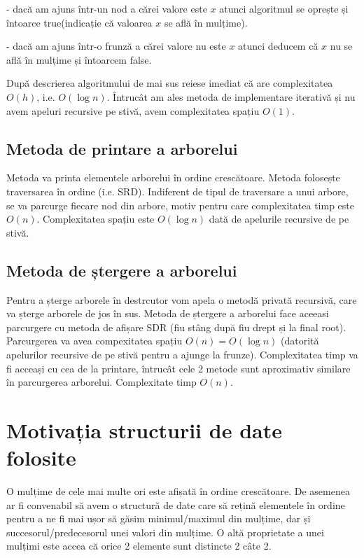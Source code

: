 \documentclass[]{report}
\begin{document}
	- dacă am ajuns într-un nod a cărei valore este $x$ atunci algoritmul se
	oprește și întoarce true(indicație că valoarea $x$ se află în mulțime).

	- dacă am ajuns într-o frunză a cărei valore nu este $x$ atunci deducem că
	$x$ nu se află în mulțime și întoarcem false.

	După descrierea algoritmului de mai sus reiese imediat că are complexitatea
	$O(h)$, i.e. $O(\log n)$. Întrucât am ales metoda de implementare iterativă
	și nu avem apeluri recursive pe stivă, avem complexitatea spațiu $O(1)$.

	\section*{Metoda de printare a arborelui}

	Metoda va printa elementele arborelui în ordine crescătoare. Metoda folosește
	traversarea în ordine (i.e. SRD). Indiferent de tipul de traversare a unui
	arbore, se va parcurge fiecare nod din arbore, motiv pentru care
	complexitatea timp este $O(n)$. Complexitatea spațiu este $O(\log n)$ dată
	de apelurile recursive de pe stivă.

	\section*{Metoda de ștergere a arborelui}
	
	Pentru a șterge arborele în destrcutor vom apela o metodă privată recursivă,
	care va șterge arborele de jos în sus. Metoda de ștergere a arborelui face
	aceeasi parcurgere cu metoda de afișare SDR (fiu stâng după fiu drept și la
	final root). Parcurgerea va avea compexitatea spațiu $O(n)=O(\log n)$
	(datorită apelurilor recursive de pe stivă pentru a ajunge la frunze).
	Complexitatea timp va fi acceași cu cea de la printare, întrucât cele 2 metode
	sunt aproximativ similare în parcurgerea arborelui. Complexitate timp $O(n)$.

	\chapter*{Motivația structurii de date folosite}

	O mulțime de cele mai multe ori este afișată în ordine crescătoare.
	De asemenea ar fi convenabil să avem o structură de date care să rețină 
	elementele în ordine pentru a ne fi mai ușor să găsim minimul/maximul din
	mulțime, dar și	succesorul/predecesorul unei valori din mulțime. O altă 
	proprietate a unei mulțimi este accea că orice 2 elemente sunt distincte 
	2 câte 2.
\end{document}

